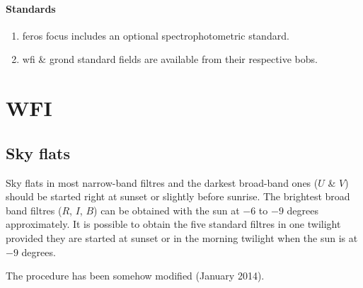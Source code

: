 \documentclass[11pt,fleqn]{book} %
\newcounter{procedure}[chapter]
\begin{document}
\paragraph{Standards}
\begin{enumerate}
  \item \gls{feros} focus includes an optional spectrophotometric standard.
  \item \gls{wfi} \& \gls{grond} standard fields are available from their respective \glspl{bob}.
\end{enumerate}

\section{WFI}


\subsection{Sky flats}
\label{sec:wfiflats}
Sky flats in most narrow-band filtres and the darkest broad-band ones ($U$ \& $V$) should be started right at sunset or slightly before sunrise.  The brightest
broad band filtres ($R$, $I$, $B$) can be obtained with the sun at $-6$ to
$-9$ degrees approximately.  It is possible to obtain the five standard filtres in one twilight provided they are started at sunset or in the morning twilight when the sun is at $-9$ degrees.

The procedure has been somehow modified (January 2014).  
\end{document}
